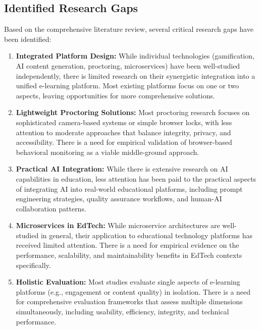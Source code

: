 \subsection{Identified Research Gaps}

Based on the comprehensive literature review, several critical research gaps have been identified:

\begin{enumerate}
    \item \textbf{Integrated Platform Design:} While individual technologies (gamification, AI content generation, proctoring, microservices) have been well-studied independently, there is limited research on their synergistic integration into a unified e-learning platform. Most existing platforms focus on one or two aspects, leaving opportunities for more comprehensive solutions.
    
    \item \textbf{Lightweight Proctoring Solutions:} Most proctoring research focuses on sophisticated camera-based systems or simple browser locks, with less attention to moderate approaches that balance integrity, privacy, and accessibility. There is a need for empirical validation of browser-based behavioral monitoring as a viable middle-ground approach.
    
    \item \textbf{Practical AI Integration:} While there is extensive research on AI capabilities in education, less attention has been paid to the practical aspects of integrating AI into real-world educational platforms, including prompt engineering strategies, quality assurance workflows, and human-AI collaboration patterns.
    
    \item \textbf{Microservices in EdTech:} While microservice architectures are well-studied in general, their application to educational technology platforms has received limited attention. There is a need for empirical evidence on the performance, scalability, and maintainability benefits in EdTech contexts specifically.
    
    \item \textbf{Holistic Evaluation:} Most studies evaluate single aspects of e-learning platforms (e.g., engagement or content quality) in isolation. There is a need for comprehensive evaluation frameworks that assess multiple dimensions simultaneously, including usability, efficiency, integrity, and technical performance.
\end{enumerate}

